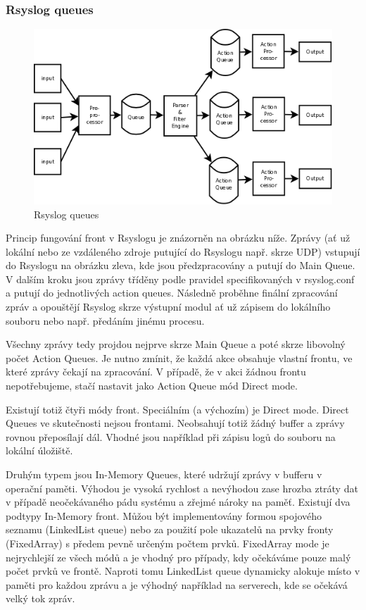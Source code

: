 \documentclass[thesis=B,czech]{FITthesis}[2012/06/26]
\begin{document}
\subsubsection*{Rsyslog queues}

\begin{figure}[ht]
	\centering
	\includegraphics[scale=0.4]{images/rsyslog-queues}
	\caption[Rsyslog queues]{Rsyslog queues~\cite{RsyslogQueues}}
\end{figure}

Princip fungování front v Rsyslogu je znázorněn na obrázku níže. Zprávy (ať už lokální nebo ze vzdáleného zdroje putující do Rsyslogu např. skrze UDP) vstupují do Rsyslogu  na obrázku zleva, kde jsou předzpracovány a putují do Main Queue. V dalším kroku jsou zprávy tříděny podle pravidel specifikovaných v rsyslog.conf a putují do jednotlivých action queues. Následně proběhne finální zpracování zpráv a opouštějí Rsyslog skrze výstupní modul ať už zápisem do lokálního souboru nebo např. předáním jinému procesu.

Všechny zprávy tedy projdou nejprve skrze Main Queue a poté skrze libovolný počet Action Queues. Je nutno zmínit, že každá akce obsahuje vlastní frontu, ve které zprávy čekají na zpracování. V případě, že v akci žádnou frontu nepotřebujeme, stačí nastavit jako Action Queue mód Direct mode.

Existují totiž čtyři módy front. Speciálním (a výchozím) je Direct mode. Direct Queues ve skutečnosti nejsou frontami. Neobsahují totiž žádný buffer a zprávy rovnou přeposílají dál. Vhodné jsou například při zápisu logů do souboru na lokální úložiště.

Druhým typem jsou In-Memory Queues, které udržují zprávy v bufferu v operační paměti. Výhodou je vysoká rychlost a nevýhodou zase hrozba ztráty dat v případě neočekávaného pádu systému a zřejmé nároky na paměť.
Existují dva podtypy In-Memory front. Můžou být implementovány formou spojového seznamu (LinkedList queue) nebo za použití pole ukazatelů na prvky fronty (FixedArray) s předem pevně určeným počtem prvků. FixedArray mode je nejrychlejší ze všech módů a je vhodný pro případy, kdy očekáváme pouze malý počet prvků ve frontě. Naproti tomu LinkedList queue dynamicky alokuje místo v paměti pro každou zprávu a je výhodný například na serverech, kde se očekává velký tok zpráv.
\end{document}
